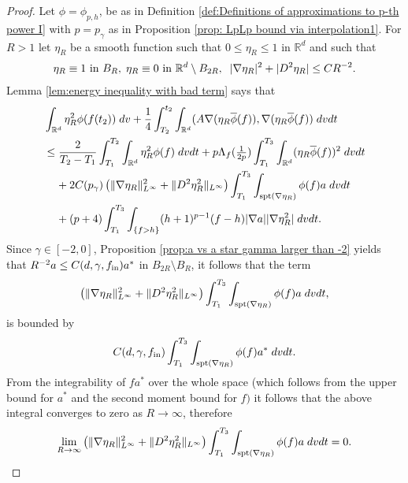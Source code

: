 \documentclass[12pt,american]{amsart}
\numberwithin{equation}{section}
\theoremstyle{plain}
\theoremstyle{definition}                  %
\def\astar{{a^*}}
\def\fin{f_{\textnormal{in}}}
\begin{document}
  \begin{proof}
  Let $\phi = \phi_{p,h}$, be as in Definition \ref{def:Definitions of approximations to p-th power I} with $p = p_\gamma$ as in Proposition \ref{prop: LpLp bound via interpolation1}. For $R>1$ let $\eta_R$ be a smooth function such that $0\leq \eta_R \leq 1$ in $\mathbb{R}^d$ and such that
  \begin{align*}
    \eta_R \equiv 1 \textnormal{ in } B_R, \;\eta_R \equiv 0 \textnormal{ in } \mathbb{R}^d\setminus B_{2R},\;\;|\nabla \eta_R|^2+|D^2\eta_R| \leq CR^{-2}.			  
  \end{align*}	  
  Lemma \ref{lem:energy inequality with bad term} says that 
  \begin{align*}
      & \int_{\mathbb{R}^d}\eta_R^2 \phi(f(t_2))\;dv + \frac{1}{4}\int_{T_2}^{t_2}\int_{\mathbb{R}^d}(A\nabla (\eta_R \overline{\phi}(f)),\nabla (\eta_R \overline{\phi}(f) )\;dvdt \\
      & \leq \frac{2}{T_2-T_1}\int_{T_1}^{T_2}\int_{\mathbb{R}^d}\eta_R^2 \phi(f)\;dvdt+p \Lambda_f  (\tfrac{1}{2p})\int_{T_1}^{T_3}\int_{\mathbb{R}^d}(\eta_R \overline{\phi}(f))^2\;dvdt\\
      & \;\;\;\;+2C(p_\gamma)\left (\|\nabla \eta_R\|_{L^\infty}^2+\|D^2\eta_R^2\|_{L^\infty} \right )\int_{T_1}^{T_3}\int_{\textnormal{spt}(\nabla \eta_R)}\phi(f)a\;dvdt\\
      &\;\;\;\;+(p+4)\int_{T_1}^{T_3}\int_{\{f>h\}} (h+1)^{p-1}(f-h)|\nabla a||\nabla \eta_R^2|\;dvdt. 
  \end{align*}
  Since $\gamma \in [-2,0]$, Proposition \ref{prop:a vs a star gamma larger than -2} yields that $R^{-2}a \leq C(d,\gamma,\fin) \astar$ in $B_{2R}\setminus B_R$, it follows that the term
  \begin{align*}
  \left (\|\nabla \eta_R\|_{L^\infty}^2+\|D^2\eta_R^2\|_{L^\infty} \right )\int_{T_1}^{T_3}\int_{\textnormal{spt}(\nabla \eta_R)}\phi(f)a\;dvdt,
  \end{align*}
  is bounded by
  \begin{align*}
    C(d,\gamma,\fin)\int_{T_1}^{T_3} \int_{\textnormal{spt}(\nabla \eta_R)} \phi(f) \astar \;dvdt.
  \end{align*}
  From the integrability of $f\astar$ over the whole space (which follows  from the upper bound for $\astar$ and the second moment bound for $f)$ it follows that the above integral converges to zero as $R\to \infty$, therefore 
  \begin{align*}
    \lim\limits_{R\to\infty }\left (\|\nabla \eta_R\|_{L^\infty}^2+\|D^2\eta_R^2\|_{L^\infty} \right )\int_{T_1}^{T_3}\int_{\textnormal{spt}(\nabla \eta_R)}\phi(f)a\;dvdt = 0.

\end{align*}
\end{proof}
\end{document}

